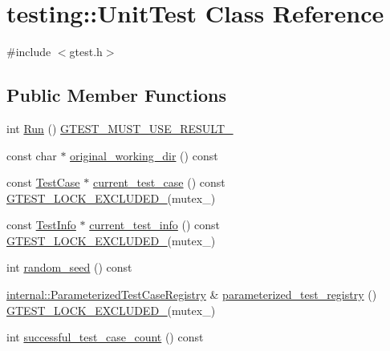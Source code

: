 \hypertarget{classtesting_1_1_unit_test}{\section{testing\-:\-:Unit\-Test Class Reference}
\label{classtesting_1_1_unit_test}
}


{\ttfamily \#include $<$gtest.\-h$>$}

\subsection*{Public Member Functions}
\begin{DoxyCompactItemize}
\item 
int \hyperlink{classtesting_1_1_unit_test_a2febc800536b44500565f4c423f359d3}{Run} () \hyperlink{gtest-port_8h_a8e5aab8276b2645f64f41c9e3021b935}{G\-T\-E\-S\-T\-\_\-\-M\-U\-S\-T\-\_\-\-U\-S\-E\-\_\-\-R\-E\-S\-U\-L\-T\-\_\-}
\item 
const char $\ast$ \hyperlink{classtesting_1_1_unit_test_a275c8d3b385106ee981f74980c34e99d}{original\-\_\-working\-\_\-dir} () const 
\item 
const \hyperlink{classtesting_1_1_test_case}{Test\-Case} $\ast$ \hyperlink{classtesting_1_1_unit_test_a2bf61896036ae03edbd7bceed14f9e18}{current\-\_\-test\-\_\-case} () const \hyperlink{gtest-port_8h_a69abff5a4efdd07bd5faebe3dd318d06}{G\-T\-E\-S\-T\-\_\-\-L\-O\-C\-K\-\_\-\-E\-X\-C\-L\-U\-D\-E\-D\-\_\-}(mutex\-\_\-)
\item 
const \hyperlink{classtesting_1_1_test_info}{Test\-Info} $\ast$ \hyperlink{classtesting_1_1_unit_test_a088eaf814a33085ace3d881d22e6bdea}{current\-\_\-test\-\_\-info} () const \hyperlink{gtest-port_8h_a69abff5a4efdd07bd5faebe3dd318d06}{G\-T\-E\-S\-T\-\_\-\-L\-O\-C\-K\-\_\-\-E\-X\-C\-L\-U\-D\-E\-D\-\_\-}(mutex\-\_\-)
\item 
int \hyperlink{classtesting_1_1_unit_test_a6fa3161a230329e07fc31a339b682a20}{random\-\_\-seed} () const 
\item 
\hyperlink{classtesting_1_1internal_1_1_parameterized_test_case_registry}{internal\-::\-Parameterized\-Test\-Case\-Registry} \& \hyperlink{classtesting_1_1_unit_test_a1d9bd4ed86901c44b525a7b6ca4cbf3b}{parameterized\-\_\-test\-\_\-registry} () \hyperlink{gtest-port_8h_a69abff5a4efdd07bd5faebe3dd318d06}{G\-T\-E\-S\-T\-\_\-\-L\-O\-C\-K\-\_\-\-E\-X\-C\-L\-U\-D\-E\-D\-\_\-}(mutex\-\_\-)
\item 
int \hyperlink{classtesting_1_1_unit_test_a1761c6274386032db8315156632eab6d}{successful\-\_\-test\-\_\-case\-\_\-count} () const 

\end{DoxyCompactItemize}
